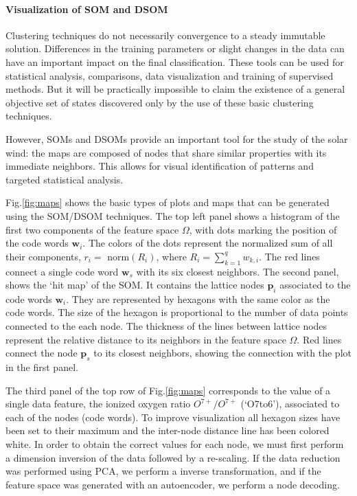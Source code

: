 \paragraph{Visualization of SOM and DSOM}
Clustering techniques do not necessarily convergence to a steady immutable solution. Differences in the training parameters or slight changes in the data can have an important impact on the final classification. These tools can be used for statistical analysis, comparisons, data visualization and training of supervised methods. But it will be practically impossible to claim the existence of a general objective set of states discovered only by the use of these basic clustering techniques.

However, SOMs and DSOMs provide an important tool for the study of the solar wind: the maps are composed of nodes that share similar properties with its immediate neighbors. This allows for visual identification of patterns and targeted statistical analysis.

Fig.\ref{fig:maps} shows the basic types of plots and maps that can be generated using the SOM/DSOM techniques. The top left panel shows a histogram of the first two components of the feature space $\Omega$, with dots marking the position of the code words $\boldsymbol{w}_i$. The colors of the dots represent the normalized sum of all their components, $r_i =$ norm$(R_i)$, where $R_i = \sum_{k=1}^q w_{k,i}$. The red lines connect a single code word $\boldsymbol{w}_s$ with its six closest neighbors. The second panel, shows the `hit map' of the SOM. It contains the lattice nodes $\boldsymbol{p}_i$ associated to the code words $\boldsymbol{w}_i$. They are represented by hexagons with the same color as the code words. The size of the hexagon is proportional to the number of data points connected to the each node. The thickness of the lines between lattice nodes represent the relative distance to its neighbors in the feature space $\Omega$. Red lines connect the node $\boldsymbol{p}_s$ to its closest neighbors, showing the connection with the plot in the first panel.

The third panel of the top row of Fig.\ref{fig:maps} corresponds to the value of a single data feature, the ionized oxygen ratio $O^{7+}/O^{7+}$ (`O7to6'), associated to each of the nodes (code words). To improve visualization all hexagon sizes have been set to their maximum and the inter-node distance line has been colored white. In order to obtain the correct values for each node, we must first perform a dimension inversion of the data followed by a re-scaling. If the data reduction was performed using PCA, we perform a inverse transformation, and if the feature space was generated with an autoencoder, we perform a node decoding.

